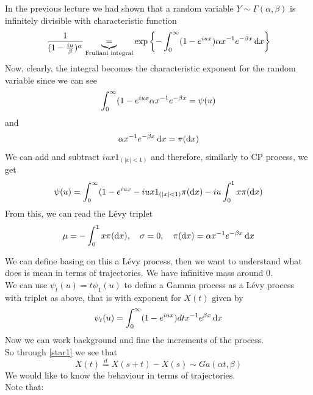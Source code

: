 \documentclass{article}
\begin{document}
	\begin{example}
		In the previous lecture we had shown that a random variable $Y \sim \Gamma(\alpha, \beta)$ is infinitely divisible with characteristic function 
		\begin{equation}
			\label{star1}
			\frac{1}{(1-\frac{iu}{\beta})^\alpha} \underbrace{=}_{\text{Frullani integral}}\exp\left\{-\int_0^\infty(1-e^{iux})\alpha x^{-1} e^{-\beta x}\mathop{}\!\mathrm{d} x\right\}
		\end{equation}
		Now, clearly, the integral becomes the characteristic exponent for the random variable since we can see
		\begin{equation*}
			\int_0^\infty(1-e^{iux}\alpha x^{-1} e^{-\beta x} = \psi(u)
		\end{equation*}
		and 
		\begin{equation*}
			\alpha x^{-1} e^{-\beta x}\mathop{}\!\mathrm{d} x = \pi(\mathop{}\!\mathrm{d} x)
		\end{equation*}
		We can add and subtract $iux 1_{(|x|<1)}$ and therefore, similarly to CP process, we get 
		\begin{equation*}
			\psi(u) = \int_0^\infty (1-e^{iux} - iux 1_{(|x|<1)}\pi(\mathop{}\!\mathrm{d} x) - iu \int_0^1x \pi(\mathop{}\!\mathrm{d} x)
		\end{equation*}
		From this, we can read the L\'evy triplet 
		\begin{equation*}
			\mu = - \int_0^1x \pi(\mathop{}\!\mathrm{d} x),  \quad \sigma = 0, \quad \pi(\mathop{}\!\mathrm{d} x) = \alpha x^{-1} e^{-\beta x}\mathop{}\!\mathrm{d} x
		\end{equation*}
	\end{example}
	We can define basing on this a L\'evy process, then we want to understand what does is mean in terms of trajectories. We have infinitive mass around 0.  \\
	We can use $\psi_t(u) = t \psi_1(u)$  to define a Gamma process as a L\'evy process with triplet as above, that is with exponent for $X(t)$ given by
	\begin{equation*}
		\psi_t(u) = \int_0^\infty (1-e^{iux})dt x^{-1}e^{\beta x}\mathop{}\!\mathrm{d} x
	\end{equation*}
	Now we can work background and fine the increments of the process. \\
	So through \eqref{star1} we see that 
	\begin{equation*}
		X(t) \stackrel{d}= X(s+t) - X(s) \sim Ga(\alpha t, \beta)
	\end{equation*}
	We would like to know the behaviour in terms of trajectories. \\
	Note that:
\end{document}
